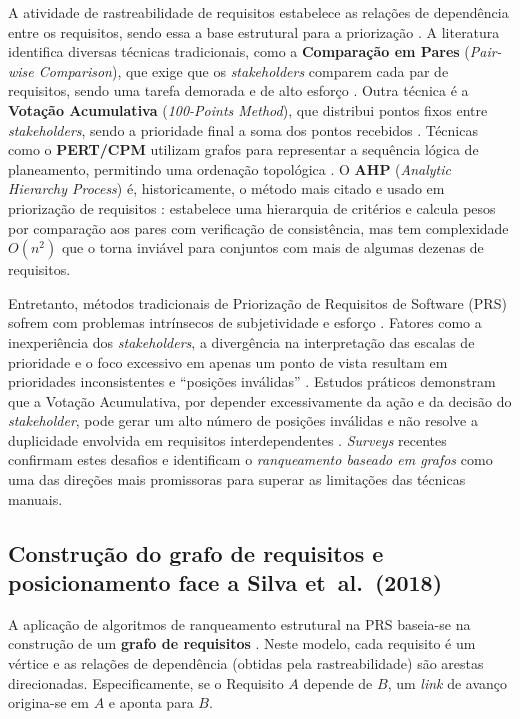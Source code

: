 A atividade de rastreabilidade de requisitos estabelece as relações
de dependência entre os requisitos, sendo essa a base estrutural para
a priorização \parencite{gotel1994, sommerville2007}. A literatura
identifica diversas técnicas tradicionais, como a \textbf{Comparação
em Pares} (\emph{Pair-wise Comparison}), que exige que os
\emph{stakeholders} comparem cada par de requisitos, sendo uma tarefa
demorada e de alto esforço \parencite{karlsson2007, karlsson1997}.
Outra técnica é a \textbf{Votação Acumulativa} (\emph{100-Points
Method}), que distribui pontos fixos entre \emph{stakeholders}, sendo
a prioridade final a soma dos pontos recebidos
\parencite{ahl2005, leffingwell2003}. Técnicas como o
\textbf{PERT/CPM} utilizam grafos para representar a sequência lógica
de planeamento, permitindo uma ordenação topológica
\parencite{kerzner2009}. O \textbf{AHP} (\emph{Analytic Hierarchy
Process}) \parencite{saaty1980} é, historicamente, o método mais
citado e usado em priorização de requisitos
\parencite{karlsson1997, berander2005}: estabelece uma hierarquia de
critérios e calcula pesos por comparação aos pares com verificação
de consistência, mas tem complexidade $O(n^2)$ que o torna inviável
para conjuntos com mais de algumas dezenas de requisitos.

Entretanto, métodos tradicionais de Priorização de Requisitos de
Software (PRS) sofrem com problemas intrínsecos de subjetividade e
esforço \parencite{firesmith2004, achimugu2014, bukhsh2020}. Fatores
como a inexperiência dos \emph{stakeholders}, a divergência na
interpretação das escalas de prioridade e o foco excessivo em apenas
um ponto de vista resultam em prioridades inconsistentes e ``posições
inválidas'' \parencite{silva2018}. Estudos práticos demonstram que a
Votação Acumulativa, por depender excessivamente da ação e da decisão
do \emph{stakeholder}, pode gerar um alto número de posições
inválidas e não resolve a duplicidade envolvida em requisitos
interdependentes \parencite{silva2018}. \emph{Surveys} recentes
\parencite{achimugu2014, bukhsh2020} confirmam estes desafios e
identificam o \emph{ranqueamento baseado em grafos} como uma das
direções mais promissoras para superar as limitações das técnicas
manuais.

\subsection{Construção do grafo de requisitos e posicionamento face
a Silva et~al.\ (2018)}
\label{sec:posicionamento}

A aplicação de algoritmos de ranqueamento estrutural na PRS baseia-se
na construção de um \textbf{grafo de requisitos}
\parencite{silva2018}. Neste modelo, cada requisito é um vértice e as
relações de dependência (obtidas pela rastreabilidade) são arestas
direcionadas. Especificamente, se o Requisito $A$ depende de $B$, um
\emph{link} de avanço origina-se em $A$ e aponta para $B$.

